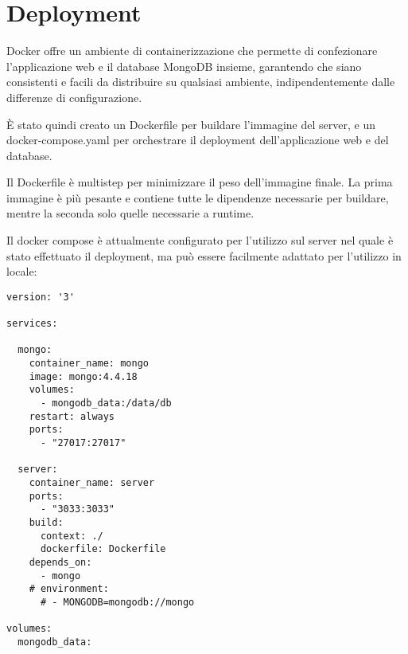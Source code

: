 \section*{Deployment}

Docker offre un ambiente di containerizzazione che permette di confezionare l'applicazione web e il database MongoDB insieme, garantendo che siano consistenti e facili da distribuire su qualsiasi ambiente, indipendentemente dalle differenze di configurazione.

È stato quindi creato un Dockerfile per buildare l'immagine del server, e un docker-compose.yaml per orchestrare il deployment dell'applicazione web e del database.

Il Dockerfile è multistep per minimizzare il peso dell'immagine finale. La prima immagine è più pesante e contiene tutte le dipendenze necessarie per buildare, mentre la seconda solo quelle necessarie a runtime.

Il docker compose è attualmente configurato per l'utilizzo sul server nel quale è stato effettuato il deployment, ma può essere facilmente adattato per l'utilizzo in locale:

\begin{verbatim}
version: '3'

services:

  mongo:
    container_name: mongo
    image: mongo:4.4.18
    volumes:
      - mongodb_data:/data/db
    restart: always
    ports:
      - "27017:27017"

  server:
    container_name: server
    ports:
      - "3033:3033"
    build:
      context: ./
      dockerfile: Dockerfile
    depends_on:
      - mongo
    # environment:
      # - MONGODB=mongodb://mongo

volumes:
  mongodb_data:

\end{verbatim}

